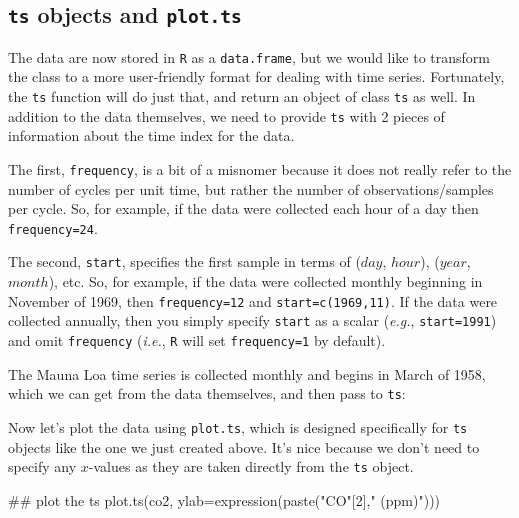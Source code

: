 \subsection{\texttt{ts} objects and \texttt{plot.ts}}

The data are now stored in \texttt{R} as a \texttt{data.frame}, but we would like to transform the class to a more user-friendly format for dealing with time series.  Fortunately, the \texttt{ts} function will do just that, and return an object of class \texttt{ts} as well.  In addition to the data themselves, we need to provide \texttt{ts} with 2 pieces of information about the time index for the data.

The first, \texttt{frequency}, is a bit of a misnomer because it does not really refer to the number of cycles per unit time, but rather the number of observations/samples per cycle.  So, for example, if the data were collected each hour of a day then \texttt{frequency=24}.

The second, \texttt{start}, specifies the first sample in terms of ($day$, $hour$), ($year$, $month$), etc.  So, for example, if the data were collected monthly beginning in November of 1969, then \texttt{frequency=12} and \texttt{start=c(1969,11)}.  If the data were collected annually, then you simply specify \texttt{start} as a scalar (\emph{e.g.}, \texttt{start=1991}) and omit \texttt{frequency} (\emph{i.e.}, \texttt{R} will set \texttt{frequency=1} by default).

The Mauna Loa time series is collected monthly and begins in March of 1958, which we can get from the data themselves, and then pass to \texttt{ts}:

\begin{Schunk}
\end{Schunk}


Now let's plot the data using \texttt{plot.ts}, which is designed specifically for \texttt{ts} objects like the one we just created above.  It's nice because we don't need to specify any $x$-values as they are taken directly from the \texttt{ts} object.

\begin{Schunk}
\begin{Sinput}
 ## plot the ts
 plot.ts(co2, ylab=expression(paste("CO"[2]," (ppm)")))
\end{Sinput}
\end{Schunk}

